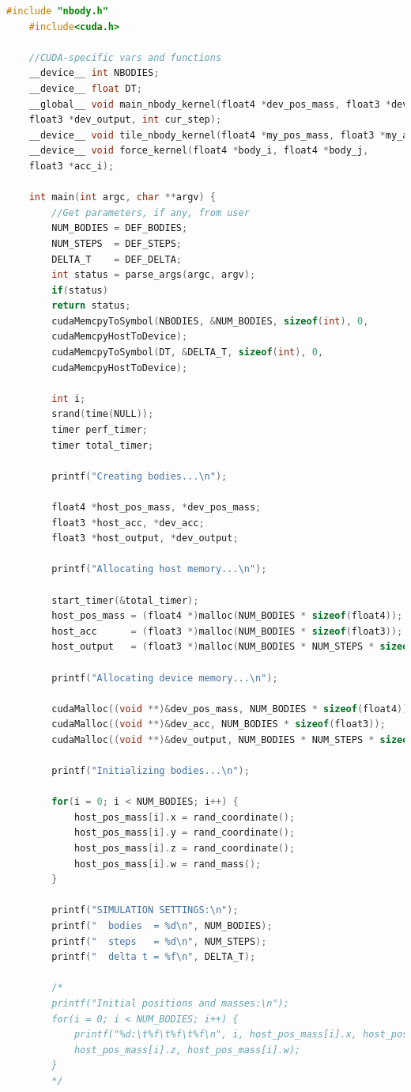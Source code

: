 \documentclass[10pt,a4paper]{article}
\begin{document}
	\begin{lstlisting}[language=c]
	#include "nbody.h"
	#include<cuda.h>
	
	//CUDA-specific vars and functions
	__device__ int NBODIES;
	__device__ float DT;
	__global__ void main_nbody_kernel(float4 *dev_pos_mass, float3 *dev_acc,
	float3 *dev_output, int cur_step);
	__device__ void tile_nbody_kernel(float4 *my_pos_mass, float3 *my_acc);
	__device__ void force_kernel(float4 *body_i, float4 *body_j,
	float3 *acc_i);
	
	int main(int argc, char **argv) {
		//Get parameters, if any, from user
		NUM_BODIES = DEF_BODIES;
		NUM_STEPS  = DEF_STEPS;
		DELTA_T    = DEF_DELTA;
		int status = parse_args(argc, argv);
		if(status)
		return status;
		cudaMemcpyToSymbol(NBODIES, &NUM_BODIES, sizeof(int), 0, 
		cudaMemcpyHostToDevice);
		cudaMemcpyToSymbol(DT, &DELTA_T, sizeof(int), 0, 
		cudaMemcpyHostToDevice);
		
		int i;
		srand(time(NULL));
		timer perf_timer;
		timer total_timer;
		
		printf("Creating bodies...\n");
		
		float4 *host_pos_mass, *dev_pos_mass;
		float3 *host_acc, *dev_acc;
		float3 *host_output, *dev_output;
		
		printf("Allocating host memory...\n");
		
		start_timer(&total_timer);
		host_pos_mass = (float4 *)malloc(NUM_BODIES * sizeof(float4));
		host_acc      = (float3 *)malloc(NUM_BODIES * sizeof(float3));
		host_output   = (float3 *)malloc(NUM_BODIES * NUM_STEPS * sizeof(float3));
		
		printf("Allocating device memory...\n");
		
		cudaMalloc((void **)&dev_pos_mass, NUM_BODIES * sizeof(float4));
		cudaMalloc((void **)&dev_acc, NUM_BODIES * sizeof(float3));
		cudaMalloc((void **)&dev_output, NUM_BODIES * NUM_STEPS * sizeof(float3));
		
		printf("Initializing bodies...\n");
		
		for(i = 0; i < NUM_BODIES; i++) {
			host_pos_mass[i].x = rand_coordinate();
			host_pos_mass[i].y = rand_coordinate();
			host_pos_mass[i].z = rand_coordinate();
			host_pos_mass[i].w = rand_mass();
		}
		
		printf("SIMULATION SETTINGS:\n");
		printf("  bodies  = %d\n", NUM_BODIES);
		printf("  steps   = %d\n", NUM_STEPS);
		printf("  delta t = %f\n", DELTA_T);
		
		/*
		printf("Initial positions and masses:\n");
		for(i = 0; i < NUM_BODIES; i++) {
			printf("%d:\t%f\t%f\t%f\n", i, host_pos_mass[i].x, host_pos_mass[i].y,
			host_pos_mass[i].z, host_pos_mass[i].w);
		}
		*/
		

\end{lstlisting}
\end{document}
